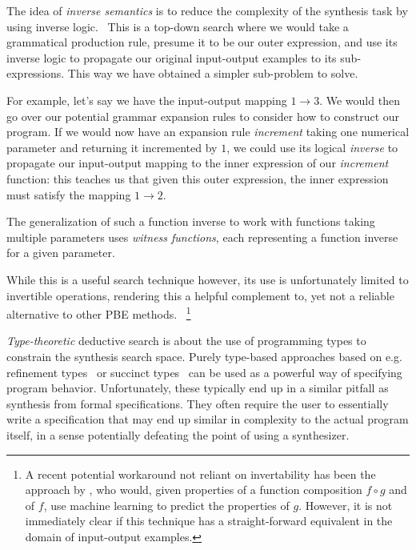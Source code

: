 \documentclass{article}
\begin{document}

The idea of \emph{inverse semantics} is to reduce the complexity
of the synthesis task by using inverse logic.~\citep{flashmeta,prose}
This is a top-down search where we would take a grammatical
production rule, presume it to be our outer expression,
and use its inverse logic to propagate our original
input-output examples to its sub-expressions.
This way we have obtained a simpler sub-problem to solve.

For example, let's say we have the input-output mapping $1 \rightarrow 3$.
We would then go over our potential grammar expansion rules to consider how to construct our program.
If we would now have an expansion rule \emph{increment} taking one numerical parameter and returning it incremented by $1$,
we could use its logical \emph{inverse} to propagate our input-output mapping to the inner expression of our \emph{increment} function:
this teaches us that given this outer expression,
the inner expression must satisfy the mapping $1 \rightarrow 2$.

The generalization of such a function inverse to work with functions
taking multiple parameters uses \emph{witness functions},
each representing a function inverse for a given parameter.

While this is a useful search technique however, its
use is unfortunately limited to invertible operations,
rendering this a helpful complement to, yet not a
reliable alternative to other PBE methods.%
~\footnote{
    A recent potential workaround not reliant on invertability
    has been the approach by \citet{odena2020learning},
    who would, given properties of a function composition
    $f \circ g$ and of $f$, use machine learning to predict
    the properties of $g$.
    However, it is not immediately clear if this technique
    has a straight-forward equivalent in the domain of
    input-output examples.
}


\emph{Type-theoretic} deductive search is about the use of programming
types to constrain the synthesis search space.
Purely type-based approaches based on e.g.
refinement types~\citep{synquid} or succinct types~\citep{guospeeding} can be used as a powerful way of specifying program behavior.
Unfortunately, these typically end up in a similar pitfall as
synthesis from formal specifications.
They often require the user to essentially write a specification
that may end up similar in complexity to the actual program itself,
in a sense potentially defeating the point of using a synthesizer.
\end{document}
